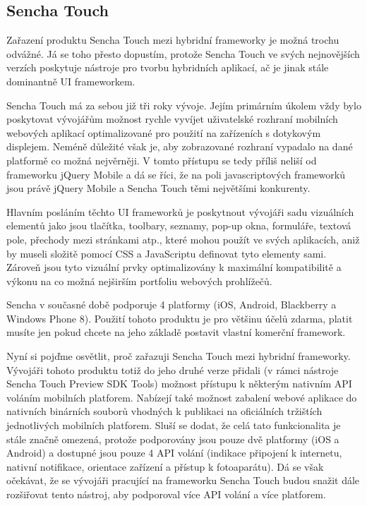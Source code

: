 \subsection{Sencha Touch}
Zařazení produktu Sencha Touch mezi hybridní frameworky je možná trochu odvážné. Já se toho přesto dopustím, protože Sencha Touch ve svých nejnovějších verzích poskytuje nástroje pro tvorbu hybridních aplikací, ač je jinak stále dominantně UI frameworkem.

Sencha Touch má za sebou již tři roky vývoje. Jejím primárním úkolem vždy bylo poskytovat vývojářům možnost rychle vyvíjet uživatelské rozhraní mobilních webových aplikací optimalizované pro použití na zařízeních s dotykovým displejem. Neméně důležité však je, aby zobrazované rozhraní vypadalo na dané platformě co možná nejvěrněji. V tomto přístupu se tedy příliš neliší od frameworku jQuery Mobile a dá se říci, že na poli javascriptových frameworků jsou právě jQuery Mobile a Sencha Touch těmi největšími konkurenty.

Hlavním posláním těchto UI frameworků je poskytnout vývojáři sadu vizuálních elementů jako jsou tlačítka, toolbary, seznamy, pop-up okna, formuláře, textová pole, přechody mezi stránkami atp., které mohou použít ve svých aplikacích, aniž by museli složitě pomocí CSS a JavaScriptu definovat tyto elementy sami. Zároveň jsou tyto vizuální prvky optimalizovány k maximální kompatibilitě a výkonu na co možná nejširším portfoliu webových prohlížečů.

Sencha v současné době podporuje 4 platformy (iOS, Android, Blackberry a Windows Phone 8). Použití tohoto produktu je pro většinu účelů zdarma, platit musíte jen pokud chcete na jeho základě postavit vlastní komerční framework.

Nyní si pojďme osvětlit, proč zařazuji Sencha Touch mezi hybridní frameworky. Vývojáři tohoto produktu totiž do jeho druhé verze přidali (v rámci nástroje Sencha Touch Preview SDK Tools) možnost přístupu k některým nativním API voláním mobilních platforem. Nabízejí také možnost zabalení webové aplikace do nativních binárních souborů vhodných k publikaci na oficiálních tržištích jednotlivých mobilních platforem. Sluší se dodat, že celá tato funkcionalita je stále značně omezená, protože podporovány jsou pouze dvě platformy (iOS a Android) a dostupné jsou pouze 4 API volání (indikace připojení k internetu, nativní notifikace, orientace zařízení a přístup k fotoaparátu). Dá se však očekávat, že se vývojáři pracující na frameworku Sencha Touch budou snažit dále rozšiřovat tento nástroj, aby podporoval více API volání a více platforem.

